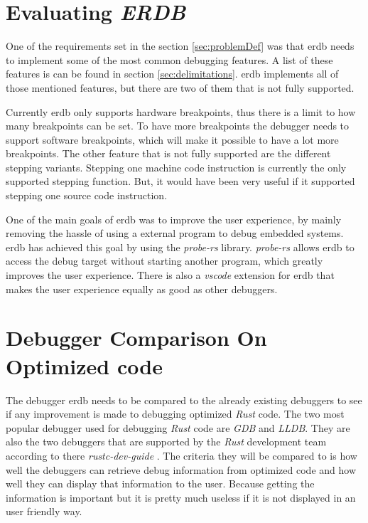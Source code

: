 \section{Evaluating \emph{ERDB}} %
One of the requirements set in the section \ref{sec:problemDef} was that \gls{erdb} needs to implement some of the most common debugging features.
A list of these features is can be found in section \ref{sec:delimitations}.
\gls{erdb} implements all of those mentioned features, but there are two of them that is not fully supported.


Currently \gls{erdb} only supports hardware breakpoints, thus there is a limit to how many breakpoints can be set.
To have more breakpoints the debugger needs to support software breakpoints, which will make it possible to have a lot more breakpoints.
The other feature that is not fully supported are the different stepping variants.
Stepping one machine code instruction is currently the only supported stepping function.
But, it would have been very useful if it supported stepping one source code instruction.


One of the main goals of \gls{erdb} was to improve the user experience, by mainly removing the hassle of using a external program to debug embedded systems.
\gls{erdb} has achieved this goal by using the \emph{probe-rs} library.
\emph{probe-rs} allows \gls{erdb} to access the debug target without starting another program, which greatly improves the user experience.
There is also a \emph{vscode} extension for \gls{erdb} that makes the user experience equally as good as other debuggers.



\section{Debugger Comparison On Optimized code} %
\label{sec:debuggercomparison}
The debugger \gls{erdb} needs to be compared to the already existing debuggers to see if any improvement is made to debugging optimized \emph{Rust} code.
The two most popular debugger used for debugging \emph{Rust} code are \emph{GDB} and \emph{LLDB}.
They are also the two debuggers that are supported by the \emph{Rust} development team according to there \emph{rustc-dev-guide} \cite{rust-dev-guide}.
The criteria they will be compared to is how well the debuggers can retrieve debug information from optimized code and how well they can display that information to the user.
Because getting the information is important but it is pretty much useless if it is not displayed in an user friendly way.


